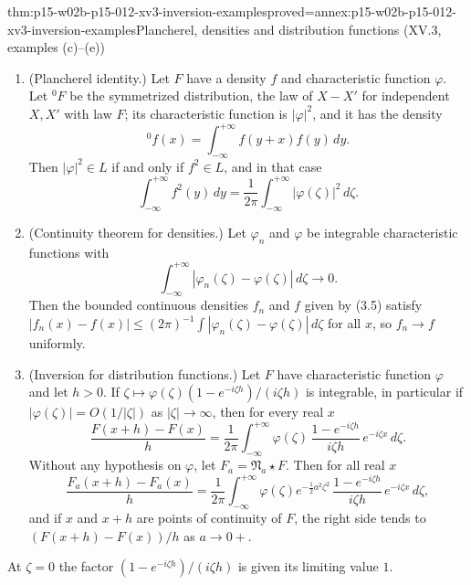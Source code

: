 \begin{hbtheorem}{thm:p15-w02b-p15-012-xv3-inversion-examples}{proved=annex:p15-w02b-p15-012-xv3-inversion-examples}{Plancherel, densities and distribution functions (XV.3, examples (c)--(e))}
\begin{enumerate}
\item[(c)] (Plancherel identity.) Let \(F\) have a density \(f\) and
      characteristic function \(\varphi\). Let \({}^0F\) be the symmetrized
      distribution, the law of \(X-X'\) for independent \(X,X'\) with law
      \(F\); its characteristic function is \(|\varphi|^2\), and it has the
      density
      \[
       {}^0f(x)=\int_{-\infty}^{+\infty}f(y+x)f(y)\,dy .
       \tag{3.9}
      \]
      Then \(|\varphi|^2\in L\) if and only if \(f^2\in L\), and in that case
      \[
       \int_{-\infty}^{+\infty}f^2(y)\,dy=\frac1{2\pi}\int_{-\infty}^{+\infty}|\varphi(\zeta)|^2\,d\zeta .
       \tag{3.8}
      \]
\item[(d)] (Continuity theorem for densities.) Let \(\varphi_n\) and
      \(\varphi\) be integrable characteristic functions with
      \[
       \int_{-\infty}^{+\infty}|\varphi_n(\zeta)-\varphi(\zeta)|\,d\zeta\longrightarrow0 .
       \tag{3.10}
      \]
      Then the bounded continuous densities \(f_n\) and \(f\) given by (3.5)
      satisfy
      \(|f_n(x)-f(x)|\leq(2\pi)^{-1}\int|\varphi_n(\zeta)-\varphi(\zeta)|\,d\zeta\)
      for all \(x\), so \(f_n\to f\) uniformly.
\item[(e)] (Inversion for distribution functions.) Let \(F\) have
      characteristic function \(\varphi\) and let \(h>0\). If
      \(\zeta\mapsto\varphi(\zeta)(1-e^{-i\zeta h})/(i\zeta h)\) is integrable,
      in particular if \(|\varphi(\zeta)|=O(1/|\zeta|)\) as
      \(|\zeta|\to\infty\), then for every real \(x\)
      \[
       \frac{F(x+h)-F(x)}h=\frac1{2\pi}\int_{-\infty}^{+\infty}\varphi(\zeta)\,
         \frac{1-e^{-i\zeta h}}{i\zeta h}\,e^{-i\zeta x}\,d\zeta .
       \tag{3.11}
      \]
      Without any hypothesis on \(\varphi\), let \(F_a=\mathfrak N_a\star F\).
      Then for all real \(x\)
      \[
       \frac{F_a(x+h)-F_a(x)}h=\frac1{2\pi}\int_{-\infty}^{+\infty}\varphi(\zeta)
         e^{-\frac12a^2\zeta^2}\,\frac{1-e^{-i\zeta h}}{i\zeta h}\,e^{-i\zeta x}\,d\zeta,
       \tag{3.12}
      \]
      and if \(x\) and \(x+h\) are points of continuity of \(F\), the right
      side tends to \((F(x+h)-F(x))/h\) as \(a\to0+\).
\end{enumerate}
At \(\zeta=0\) the factor \((1-e^{-i\zeta h})/(i\zeta h)\) is given its
limiting value \(1\).
\end{hbtheorem}

